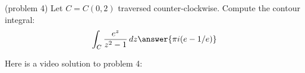 \documentclass[handout]{ximera}
\begin{document}
\begin{problem}(problem 4)
Let $C = C(0, 2)$ traversed counter-clockwise. Compute the contour integral:\\
\[
\int_C \frac{e^z}{z^2 -1} \, dz  \answer{\pi i (e-1/e)}
\]
\end{problem}

Here is a video solution to problem 4:\\
\begin{foldable}
\end{foldable}
\end{document}

